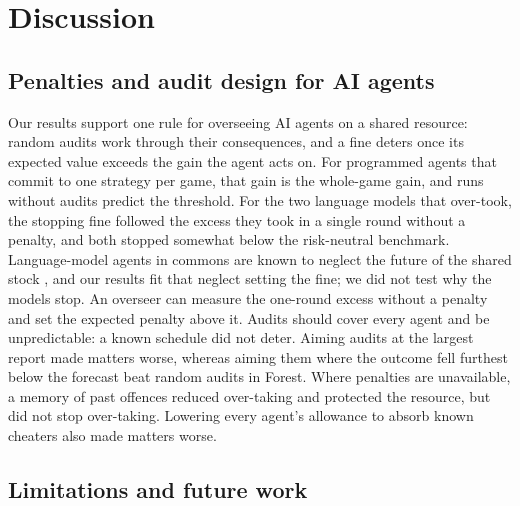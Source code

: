 \section{Discussion}

\subsection{Penalties and audit design for AI agents}

Our results support one rule for overseeing AI agents on a shared resource: random audits work through their consequences, and a fine deters once its expected value exceeds the gain the agent acts on. For programmed agents that commit to one strategy per game, that gain is the whole-game gain, and runs without audits predict the threshold. For the two language models that over-took, the stopping fine followed the excess they took in a single round without a penalty, and both stopped somewhat below the risk-neutral benchmark. Language-model agents in commons are known to neglect the future of the shared stock \citep{piatti2024cooperate,bracale2026draining}, and our results fit that neglect setting the fine; we did not test why the models stop. An overseer can measure the one-round excess without a penalty and set the expected penalty above it. Audits should cover every agent and be unpredictable: a known schedule did not deter. Aiming audits at the largest report made matters worse, whereas aiming them where the outcome fell furthest below the forecast beat random audits in Forest. Where penalties are unavailable, a memory of past offences reduced over-taking and protected the resource, but did not stop over-taking. Lowering every agent's allowance to absorb known cheaters also made matters worse.

\subsection{Limitations and future work}

